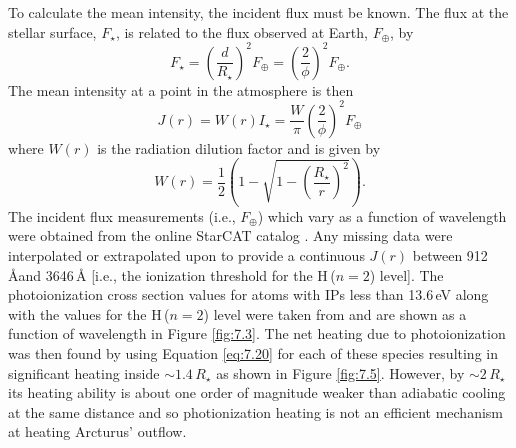 To calculate the mean intensity, the incident flux must be known. The flux at the stellar surface, $F_{\star}$, is related to the flux observed at Earth, $F_{\oplus}$, by
\begin{equation}
F_{\star}= \left(\frac{d}{R_{\star}}\right)^2F_{\oplus}=\left(\frac{2}{\phi}\right)^2F_{\oplus}.
\end{equation}
The mean intensity at a point in the atmosphere is then
\begin{equation}
J(r)=W(r)I_{\star} =\frac{W}{\pi}\left(\frac{2}{\phi}\right)^2F_{\oplus}
\end{equation}
where $W(r)$ is the radiation dilution factor and is given by
\begin{equation}
W(r)=\frac{1}{2}\left(1 - \sqrt{1-\left(\frac{R_{\star}}{r}\right)^2} \right).
\end{equation}
The incident flux measurements (i.e., $F_{\oplus}$) which vary as a function of wavelength were obtained from the online StarCAT catalog \citep{ayres_2010}. Any missing data were interpolated or extrapolated upon to provide a continuous $J(r)$ between 912\,\AA and 3646\,\AA\,\,[i.e., the ionization threshold for the H\,($n=2$) level]. The photoionization cross section values for atoms with IPs less than 13.6\,eV along with the values for the H\,($n=2$) level were taken from \cite{mathisen_1984} and are shown as a function of wavelength in Figure \ref{fig:7.3}. The net heating due to photoionization was then found by using Equation \ref{eq:7.20} for each of these species resulting in significant heating inside $\sim 1.4\,R_{\star}$ as shown in Figure \ref{fig:7.5}. However, by $\sim 2\,R_{\star}$ its heating ability is about one order of magnitude weaker than adiabatic cooling at the same distance and so photionization heating is not an efficient mechanism at heating Arcturus' outflow.

